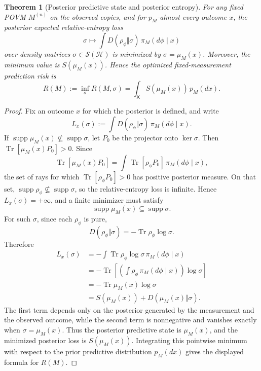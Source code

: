 \documentclass[journal]{IEEEtran}
\newtheorem{theorem}{Theorem}
\begin{document}
\begin{theorem}[Posterior predictive state and posterior entropy]
\label{thm:fixed_measurement_bayes_act}
\label{cor:fixed_measurement_entropy_risk}
For any fixed POVM \(M^{(n)}\) on the observed copies, and for \(p_M\)-almost
every outcome \(x\), the posterior expected relative-entropy loss
\[
    \sigma\longmapsto
    \int D(\rho_\phi\Vert\sigma)\,\pi_M(d\phi\mid x)
\]
over density matrices \(\sigma\in\mathcal S(\mathcal H)\) is minimized by
\(\sigma=\mu_M(x)\).  Moreover, the minimum value is \(S(\mu_M(x))\).  Hence the
optimized fixed-measurement prediction risk is
\[
    R(M)
    :=
    \inf_\sigma R(M,\sigma)
    =
    \int_{\mathsf X} S(\mu_M(x))\,p_M(dx).
\]
\end{theorem}

\begin{proof}
Fix an outcome \(x\) for which the posterior is defined, and write
\[
    L_x(\sigma)
    :=
    \int D(\rho_\phi\Vert\sigma)\,\pi_M(d\phi\mid x).
\]
If \(\operatorname{supp}\mu_M(x)\nsubseteq\operatorname{supp}\sigma\), let
\(P_0\) be the projector onto \(\ker\sigma\).  Then
\(\operatorname{Tr}[\mu_M(x)P_0]>0\).  Since
\[
    \operatorname{Tr}[\mu_M(x)P_0]
    =
    \int \operatorname{Tr}[\rho_\phi P_0]\,\pi_M(d\phi\mid x),
\]
the set of rays for which \(\operatorname{Tr}[\rho_\phi P_0]>0\) has positive
posterior measure.  On that set,
\(\operatorname{supp}\rho_\phi\nsubseteq\operatorname{supp}\sigma\), so the
relative-entropy loss is infinite.  Hence \(L_x(\sigma)=+\infty\), and a finite
minimizer must satisfy
\[
    \operatorname{supp}\mu_M(x)
    \subseteq
    \operatorname{supp}\sigma.
\]
For such \(\sigma\), since each \(\rho_\phi\) is pure,
\[
    D(\rho_\phi\Vert\sigma)
    =
    -\operatorname{Tr}\rho_\phi\log\sigma.
\]
Therefore
\[
\begin{aligned}
    L_x(\sigma)
    &=
    -\int \operatorname{Tr}\rho_\phi\log\sigma\,\pi_M(d\phi\mid x)       \\
    &=
    -\operatorname{Tr}\!\left[
        \left(\int \rho_\phi\,\pi_M(d\phi\mid x)\right)
        \log\sigma
    \right]                                                          \\
    &=
    -\operatorname{Tr}\mu_M(x)\log\sigma                              \\
    &=
    S(\mu_M(x))+D(\mu_M(x)\Vert\sigma).
\end{aligned}
\]
The first term depends only on the posterior generated by the measurement and
the observed outcome, while the second term is nonnegative and vanishes exactly
when \(\sigma=\mu_M(x)\).  Thus the posterior predictive state is
\(\mu_M(x)\), and the minimized posterior loss is \(S(\mu_M(x))\).  Integrating
this pointwise minimum with respect to the prior predictive distribution
\(p_M(dx)\) gives the displayed formula for \(R(M)\).
\end{proof}
\end{document}
